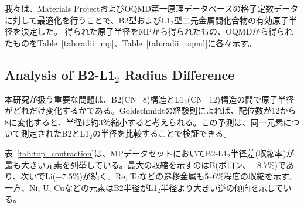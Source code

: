 \documentclass[a4paper,10pt,5p]{elsarticle}
\begin{document}
我々は、Materials ProjectおよびOQMD第一原理データベースの格子定数データに対して最適化を行うことで、B2型およびL1$_2$型二元金属間化合物の有効原子半径を決定した。
得られた原子半径をMPから得られたもの、OQMDから得られたものをTable~\ref{tab:radii_mp}、Table~\ref{tab:radii_oqmd}に各々示す。
  
  


\subsection{Analysis of B2-L1$_2$ Radius Difference}

本研究が扱う重要な問題は、B2(CN=8)構造とL1$_2$(CN=12)構造の間で原子半径がどれだけ変化するかである。Goldschmidtの経験則によれば、配位数が12から8に変化すると、半径は約3％縮小すると考えられる。この予測は、同一元素について測定されたB2とL1$_2$の半径を比較することで検証できる。

表~\ref{tab:top_contraction}は、MPデータセットにおいてB2-L1$_2$半径差(収縮率)が最も大きい元素を列挙している。最大の収縮を示すのはB(ボロン、$-8.7$\%)であり、次いでLi($-7.5$\%)が続く。Re, Tcなどの遷移金属も5--6\%程度の収縮を示す。一方、Ni, U, Cuなどの元素はB2半径がL1$_2$半径より大きい逆の傾向を示している。


\end{document}
